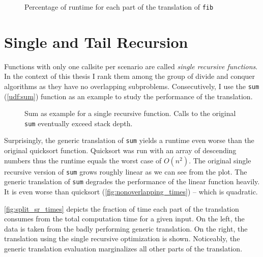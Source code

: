 \begin{figure}[h!]
    \centering\small
    
    \caption{Percentage of runtime for each part of the translation of \texttt{fib}}
    \label{fig:split_times}
\end{figure}


\iffalse
\begin{figure}[h]
    \centering\small
    
    \caption{Impact of the number of scenarios on the runtime. Single recursive function with expensive predicates}
    \label{fig:recn_times}
\end{figure}

Impact of number of scenarios (Overhead by predicates) \autoref{fig:recn_times}

\fi




\section{Single and Tail Recursion}

Functions with only one callsite per scenario are called \textit{single recursive functions}. In the context of this thesis I rank them among the group of divide and conquer algorithms as they have no overlapping subproblems. Consecutively, I use the \texttt{sum} (\autoref{udf:sum}) function as an example to study the performance of the translation.

\begin{figure}[h!]
    \centering\small
    
    \caption{Sum as example for a single recursive function. Calls to the original \texttt{sum} eventually exceed stack depth.}
    \label{fig:factorial_times}
\end{figure}


Surprisingly, the generic translation of \texttt{sum} yields a runtime even worse than the original quicksort function. Quicksort was run with an array of descending numbers thus the runtime equals the worst case of $O(n^2)$. The original single recursive version of \texttt{sum} grows roughly linear as we can see from the plot. The generic translation of \texttt{sum} degrades the performance of the linear function heavily. It is even worse than quicksort (\autoref{fig:nonoverlapping_times}) -- which is quadratic.

\autoref{fig:split_sr_times} depicts the fraction of time each part of the translation consumes from the total computation time for a given input. On the left, the data is taken from the badly performing generic translation. On the right, the translation using the single recursive optimization is shown. Noticeably, the generic translation evaluation marginalizes all other parts of the translation.

